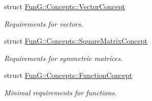 \begin{DoxyCompactItemize}
struct \hyperlink{structFunG_1_1Concepts_1_1VectorConcept}{Fun\+G\+::\+Concepts\+::\+Vector\+Concept}
\begin{DoxyCompactList}\small\item\em Requirements for vectors. \end{DoxyCompactList}\item 
struct \hyperlink{structFunG_1_1Concepts_1_1SquareMatrixConcept}{Fun\+G\+::\+Concepts\+::\+Square\+Matrix\+Concept}
\begin{DoxyCompactList}\small\item\em Requirements for symmetric matrices. \end{DoxyCompactList}\item 
struct \hyperlink{structFunG_1_1Concepts_1_1FunctionConcept}{Fun\+G\+::\+Concepts\+::\+Function\+Concept}
\begin{DoxyCompactList}\small\item\em Minimal requirements for functions. \end{DoxyCompactList}\end{DoxyCompactItemize}
